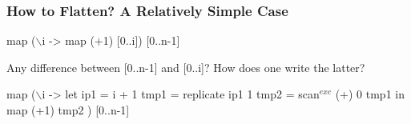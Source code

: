 \documentclass{beamer}
\renewcommand{\emph}[1]{\textcolor{structure}{#1}}
\newcommand{\emp}[1]{\textcolor{DikuRed}{ #1}}
\newcommand{\mymath}[1]{$ #1 $}
\newcommand{\myindu}[1]{^{#1}}
\begin{document}
\begin{frame}[fragile,t]
  \frametitle{How to Flatten? A Relatively Simple Case}
\bigskip
\begin{colorcode}
\alert{map (\mymath{\backslash}i -> map (+1) [0..i]) [0..n-1]}
\end{colorcode}
\bigskip

Any difference between \emph{[0..n-1]} and \emp{[0..i]}?
How does one write the latter?
\pause\bigskip

\begin{colorcode}
\emp{map} (\mymath{\backslash}i -> let ip1 = i + 1
               tmp1 = \alert{replicate ip1 1}
               tmp2 = \alert{scan\mymath{\myindu{exc}} (+) 0 tmp1}
           in         \alert{map (+1) tmp2}     )
    [0..n-1]
\end{colorcode}

\end{frame}
\end{document}
